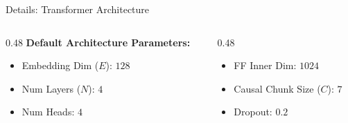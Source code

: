 \documentclass[8pt,hyperref={pdfpagelabels=true},xcolor=table,aspectratio=169]{beamer}
\begin{document}
\begin{frame}{Details: Transformer Architecture}
    \vspace{1.0em}
    \begin{columns}[T]
        \begin{column}{0.48\textwidth}
            \textbf{Default Architecture Parameters:}
            \begin{itemize}
                \item Embedding Dim ($E$): $128$
                \item Num Layers ($N$): $4$
                \item Num Heads: $4$
            \end{itemize}
        \end{column}
        \begin{column}{0.48\textwidth}
            \vspace{1.2em}
            \begin{itemize}
                \item FF Inner Dim: $1024$
                \item Causal Chunk Size ($C$): $7$
                \item Dropout: $0.2$
            \end{itemize}
        \end{column}
    \end{columns}
\end{frame}
\end{document}

